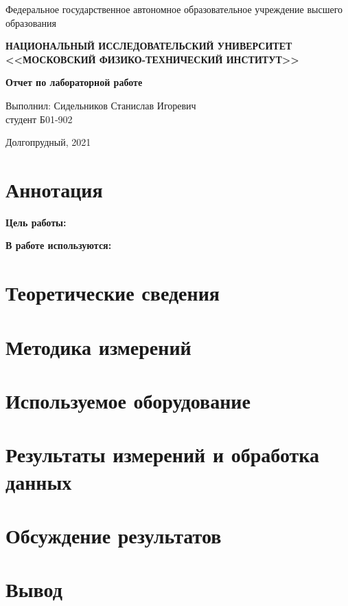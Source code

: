 


\begin{center}
    
    \normalsize{Федеральное государственное автономное образовательное учреждение высшего образования}
    
    \textbf{НАЦИОНАЛЬНЫЙ ИССЛЕДОВАТЕЛЬСКИЙ УНИВЕРСИТЕТ \\ <<МОСКОВСКИЙ ФИЗИКО-ТЕХНИЧЕСКИЙ ИНСТИТУТ>>}
    \vspace{13ex}
    
    \textbf{Отчет по лабораторной работе }
    \vspace{40ex}
\end{center}
\begin{flushright}
    \normalsize{Выполнил: Сидельников Станислав Игоревич \\ студент Б01-902\\}
\end{flushright}
    
\vfill
    
\begin{center}
Долгопрудный, 2021
\end{center}

\thispagestyle{empty} %

\newpage
	\section{Аннотация}
	
	\textbf{Цель работы:}
	
	\textbf{В работе используются:}
	
	\section{Теоретические сведения}

	\section{Методика измерений}

	\section{Используемое оборудование}
	
	\section{Результаты измерений и обработка данных}

	\section{Обсуждение результатов}
	
	\section{Вывод}


